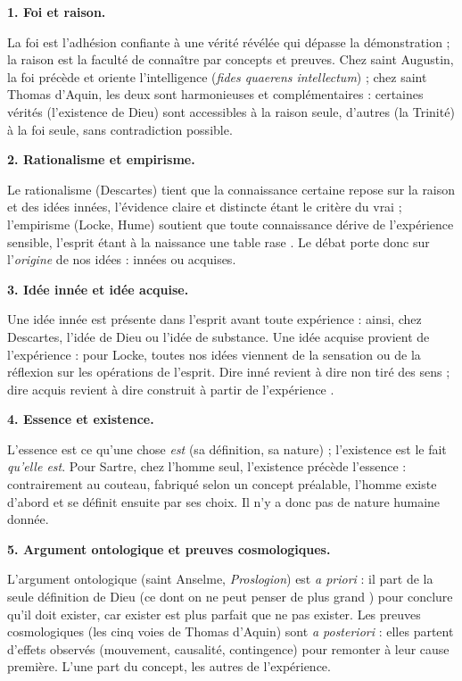 \documentclass[11pt]{article}
\begin{document}
\begin{corrige}

\textbf{1. Foi et raison.}\par La foi est l'adhésion confiante à une vérité révélée qui dépasse la démonstration ; la raison est la faculté de connaître par concepts et preuves. Chez saint Augustin, la foi précède et oriente l'intelligence (\emph{fides quaerens intellectum}) ; chez saint Thomas d'Aquin, les deux sont harmonieuses et complémentaires : certaines vérités (l'existence de Dieu) sont accessibles à la raison seule, d'autres (la Trinité) à la foi seule, sans contradiction possible.

\textbf{2. Rationalisme et empirisme.}\par Le rationalisme (Descartes) tient que la connaissance certaine repose sur la raison et des idées innées, l'évidence claire et distincte étant le critère du vrai ; l'empirisme (Locke, Hume) soutient que toute connaissance dérive de l'expérience sensible, l'esprit étant à la naissance une \guillemotleft table rase \guillemotright. Le débat porte donc sur l'\emph{origine} de nos idées : innées ou acquises.

\textbf{3. Idée innée et idée acquise.}\par Une idée innée est présente dans l'esprit avant toute expérience : ainsi, chez Descartes, l'idée de Dieu ou l'idée de substance. Une idée acquise provient de l'expérience : pour Locke, toutes nos idées viennent de la sensation ou de la réflexion sur les opérations de l'esprit. Dire \guillemotleft inné \guillemotright revient à dire \guillemotleft non tiré des sens \guillemotright ; dire \guillemotleft acquis \guillemotright revient à dire \guillemotleft construit à partir de l'expérience \guillemotright.

\textbf{4. Essence et existence.}\par L'essence est ce qu'une chose \emph{est} (sa définition, sa nature) ; l'existence est le fait \emph{qu'elle est}. Pour Sartre, chez l'homme seul, \guillemotleft l'existence précède l'essence \guillemotright : contrairement au couteau, fabriqué selon un concept préalable, l'homme existe d'abord et se définit ensuite par ses choix. Il n'y a donc pas de nature humaine donnée.

\textbf{5. Argument ontologique et preuves cosmologiques.}\par L'argument ontologique (saint Anselme, \emph{Proslogion}) est \emph{a priori} : il part de la seule définition de Dieu (\guillemotleft ce dont on ne peut penser de plus grand \guillemotright) pour conclure qu'il doit exister, car exister est plus parfait que ne pas exister. Les preuves cosmologiques (les \guillemotleft cinq voies \guillemotright de Thomas d'Aquin) sont \emph{a posteriori} : elles partent d'effets observés (mouvement, causalité, contingence) pour remonter à leur cause première. L'une part du concept, les autres de l'expérience.

\end{corrige}
\end{document}
